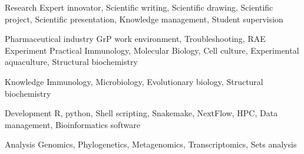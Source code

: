 

\begin{cvskills}

  \cvskill
    {Research} %
    {Expert innovator, Scientific writing, Scientific drawing, Scientific project, Scientific presentation, \hfill \break Knowledge management, Student supervision} %
    
  \cvskill
    {Pharmaceutical industry} %
    {GrP work environment, Troubleshooting, RAE} %
  \cvskill
    {Experiment} %
    {Practical Immunology, Molecular Biology, Cell culture, Experimental aquaculture, Structural biochemistry} %
    
  \cvskill
    {Knowledge} %
    {Immunology, Microbiology, Evolutionary biology, Structural biochemistry} %
    
  \cvskill
    {Development} %
    {R, python, Shell scripting, Snakemake, NextFlow, HPC, Data management, Bioinformatics software} %
    
  \cvskill
    {Analysis} %
    {Genomics, Phylogenetics, Metagenomics, Transcriptomics, Sets analysis} %

\end{cvskills}
